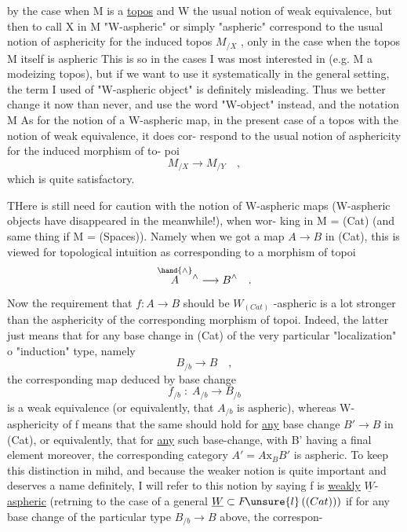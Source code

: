 
 by the case when M is a \uline{topos} and W the usual notion of weak equivalence,
but then to call X in M  "W-aspheric" or simply "aspheric"  correspond to
the usual notion of asphericity for the induced topos $M_{/X}$ , only in the
case when the  topos M itself is aspheric  This is  so in the cases
I was most interested in (e.g. M a modeizing topos),  but if we want to
use it systematically in the general setting,  the 
term I used of "W-aspheric object" is definitely misleading.  Thus we
better change it now than never,  and use the word "W-object" instead,
and the notation M As for the notion of a W-aspheric map,  in the
present case of a topos with the notion of weak equivalence,  it does cor-%
respond to the usual notion of asphericity for the induced morphism of to-%
poi
\[ M_{/X} \longrightarrow M_{/Y} \quad , \]
which is quite satisfactory.

THere is still need for caution with the  notion of W-aspheric
maps (W-aspheric objects have disappeared in the meanwhile!),  when wor-%
king in M = (Cat)  (and same thing if M = (Spaces)).  Namely when we got
a map  $A \longrightarrow B$ in (Cat),  this is viewed for topological intuition as
corresponding to a morphism of topoi
\[ \overset{\hand{\wedge}}{A}{}^{\wedge} \longrightarrow B^{\wedge} \quad . \]
Now the requirement that  $f\colon A \to B$ should be $W_{(Cat)}$ -aspheric  is a lot
stronger than the asphericity of the corresponding morphism of topoi.
Indeed,  the latter just means that for any base change  in (Cat) of
the very particular "localization" o "induction" type,  namely
\[ B_{/b} \longrightarrow B \quad , \]
the corresponding map deduced by base change
\[ f_{/b} \;:\; A_{/b} \longrightarrow B_{/b} \]
is a weak equivalence (or equivalently,  that $A_{/b}$ is aspheric),  whereas
W-asphericity of f means that the same should hold for \uline{any} base change
$B' \to B$ in (Cat),  or equivalently,  that for \uline{any} such base-change,  with
B' having a final element moreover,  the corresponding  category
$A'=A\mathrm{x}_B B'$  is aspheric.  To keep this distinction in mihd,  and because
the weaker notion is quite important and deserves a name definitely,
I will refer to this notion by saying f is \uline{weakly} \uline{$\underline{W}$}-\uline{aspheric}  (retrning
to the case of a general $\underline{W} \subset F\!\unsure{l}\,((Cat)))$  if 
for any base change of the particular type $B_{/b} \to B$ above,  the correspon-%

